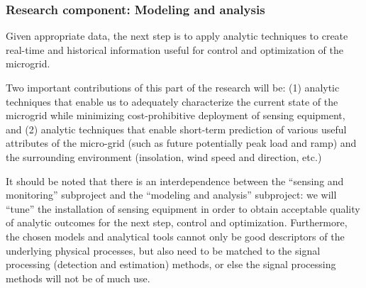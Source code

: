 
\subsubsection{Research component: Modeling and analysis}
\label{sec:modeling}

Given appropriate data, the next step is to apply analytic techniques to
create real-time and historical information useful for control and
optimization of the microgrid.

Two important contributions of this part of the research will be: (1) analytic techniques that enable us to adequately characterize the current state of the microgrid while minimizing cost-prohibitive deployment of sensing equipment, and (2) analytic techniques that enable short-term prediction of various useful attributes of the micro-grid (such as future potentially peak load and ramp) and the surrounding environment (insolation, wind speed and direction, etc.)  

It should be noted that there is an interdependence between the ``sensing
and monitoring'' subproject and the ``modeling and analysis'' subproject:
we will ``tune'' the installation of sensing equipment in order to obtain
acceptable quality of analytic outcomes for the next step, control and
optimization. Furthermore, the chosen models and analytical tools cannot
only be good descriptors of the underlying physical processes, but also
need to be matched to the signal processing (detection and estimation)
methods, or else the signal processing methods will not be of much use.


